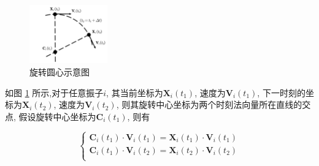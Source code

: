 \documentclass{article}
\begin{document}
\begin{figure}[H]
	\centering
	\includegraphics[width=0.3\textwidth]{./figs/CenterEps.pdf}
	\vspace{-0.2cm}
	\caption{旋转圆心示意图}
	\label{fig:fig232.1}
\end{figure}

如图 \ref{fig:fig232.1} 所示,对于任意振子$i$, 其当前坐标为$\mathbf{X}_i\left( t_1 \right)$, 速度为$\mathbf{V}_i\left( t_1 \right)$, 下一时刻的坐标为$\mathbf{X}_i\left( t_2 \right)$, 速度为$\mathbf{V}_i\left( t_2 \right)$, 则其旋转中心坐标为两个时刻法向量所在直线的交点, 假设旋转中心坐标为$\mathbf{C}_i\left( t_1 \right)$, 则有

\vspace{-0.5cm}

$$
\begin{cases}
	\mathbf{C}_i\left( t_1 \right) \cdot \mathbf{V}_i\left( t_1 \right) =\mathbf{X}_i\left( t_1 \right) \cdot \mathbf{V}_i\left( t_1 \right) \\
	\mathbf{C}_i\left( t_1 \right) \cdot \mathbf{V}_i\left( t_2 \right) =\mathbf{X}_i\left( t_2 \right) \cdot \mathbf{V}_i\left( t_2 \right) \\
\end{cases}
$$


\end{document}
